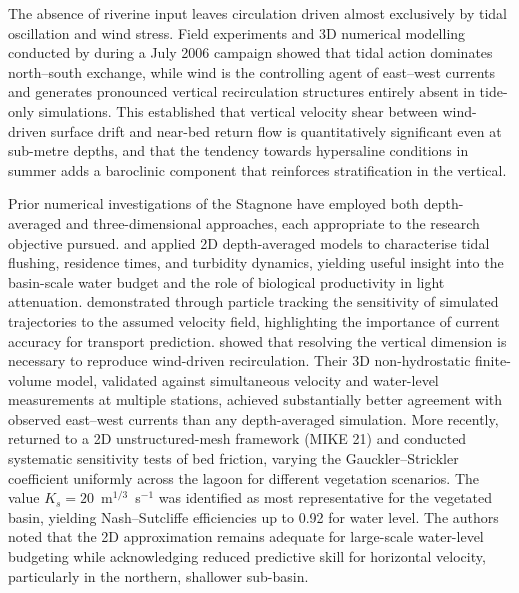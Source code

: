 The absence of riverine input leaves circulation driven almost exclusively by
tidal oscillation and wind stress. Field experiments and 3D
numerical modelling conducted by \citet{DeMarchis2012} during a July 2006
campaign showed that tidal action dominates north--south exchange, while wind
is the controlling agent of east--west currents and generates
pronounced vertical recirculation structures entirely absent in tide-only
simulations. This established that vertical velocity shear between wind-driven
surface drift and near-bed return flow is quantitatively significant even at
sub-metre depths, and that the tendency towards hypersaline conditions in
summer \citep{LaLoggia2004} adds a baroclinic component that reinforces
stratification in the vertical.

Prior numerical investigations of the Stagnone have employed both
depth-averaged and three-dimensional approaches, each appropriate to the
research objective pursued. \citet{LaLoggia2004} and \citet{DiMarca2009}
applied 2D depth-averaged models to characterise tidal flushing, residence
times, and turbidity dynamics, yielding useful insight into the basin-scale
water budget and the role of biological productivity in light attenuation.
\citet{Ciraolo2009a} demonstrated through particle tracking the sensitivity of
simulated trajectories to the assumed velocity field, highlighting the
importance of current accuracy for transport prediction.
\citet{DeMarchis2012} showed that resolving the vertical dimension is
necessary to reproduce wind-driven recirculation. Their 3D non-hydrostatic
finite-volume model, validated against simultaneous velocity and water-level
measurements at multiple stations, achieved substantially better agreement
with observed east--west currents than any depth-averaged simulation. More
recently, \citet{Ingrassia2024} returned to a 2D unstructured-mesh framework
(MIKE 21) and conducted systematic sensitivity tests of bed friction, varying
the Gauckler--Strickler coefficient uniformly across the lagoon for different
vegetation scenarios. The value $K_s = 20$~m$^{1/3}$~s$^{-1}$ was identified
as most representative for the vegetated basin, yielding Nash--Sutcliffe
efficiencies up to 0.92 for water level. The authors noted that the 2D
approximation remains adequate for large-scale water-level budgeting while
acknowledging reduced predictive skill for horizontal velocity, particularly
in the northern, shallower sub-basin.

